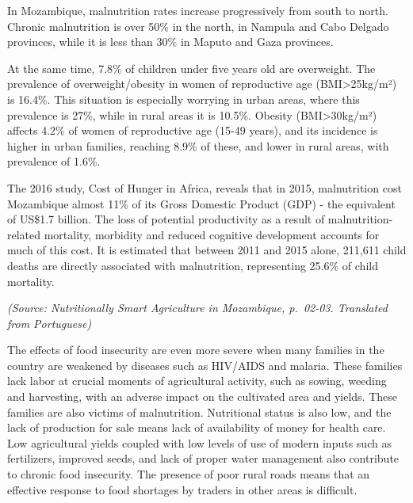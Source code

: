 \documentclass[
]{book}
\begin{document}
In Mozambique, malnutrition rates increase progressively from south to north. Chronic malnutrition is over 50\% in the north, in Nampula and Cabo Delgado provinces, while it is less than 30\% in Maputo and Gaza provinces.

At the same time, 7.8\% of children under five years old are overweight. The prevalence of overweight/obesity in women of reproductive age (BMI\textgreater25kg/m²) is 16.4\%. This situation is especially worrying in urban areas, where this prevalence is 27\%, while in rural areas it is 10.5\%. Obesity (BMI\textgreater30kg/m²) affects 4.2\% of women of reproductive age (15-49 years), and its incidence is higher in urban families, reaching 8.9\% of these, and lower in rural areas, with prevalence of 1.6\%.

The 2016 study, Cost of Hunger in Africa, reveals that in 2015, malnutrition cost Mozambique almost 11\% of its Gross Domestic Product (GDP) - the equivalent of US\$1.7 billion. The loss of potential productivity as a result of malnutrition-related mortality, morbidity and reduced cognitive development accounts for much of this cost. It is estimated that between 2011 and 2015 alone, 211,611 child deaths are directly associated with malnutrition, representing 25.6\% of child mortality.

\emph{(Source: Nutritionally Smart Agriculture in Mozambique, p.~02-03. Translated from Portuguese)}

The effects of food insecurity are even more severe when many families in the country are weakened by diseases such as HIV/AIDS and malaria. These families lack labor at crucial moments of agricultural activity, such as sowing, weeding and harvesting, with an adverse impact on the cultivated area and yields. These families are also victims of malnutrition. Nutritional status is also low, and the lack of production for sale means lack of availability of money for health care. Low agricultural yields coupled with low levels of use of modern inputs such as fertilizers, improved seeds, and lack of proper water management also contribute to chronic food insecurity. The presence of poor rural roads means that an effective response to food shortages by traders in other areas is difficult.
\end{document}
